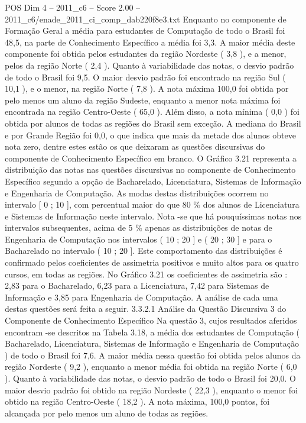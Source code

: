 \begin{textsample}{POS Dim 4 – 2011\_c6 – Score 2.00 – 2011\_c6/enade\_2011\_ci\_comp\_dab220f8e3.txt}
Enquanto no componente de Formação Geral a média para estudantes de Computação de todo o Brasil foi 48,5, na parte de Conhecimento Específico a média foi 3,3.
A maior média deste componente foi obtida pelos estudantes da região Nordeste ( 3,8 ), e a menor, pelos da região Norte ( 2,4 ).
Quanto à variabilidade das notas, o desvio padrão de todo o Brasil foi 9,5.
O maior desvio padrão foi encontrado na região Sul ( 10,1 ), e o menor, na região Norte ( 7,8 ).
A nota máxima 100,0 foi obtida por pelo menos um aluno da região Sudeste, enquanto a menor nota máxima foi encontrada na região Centro-Oeste ( 65,0 ).
Além disso, a nota mínima ( 0,0 ) foi obtida por alunos de todas as regiões do Brasil sem exceção.
A mediana do Brasil e por Grande Região foi 0,0, o que indica que mais da metade dos alunos obteve nota zero, dentre estes estão os que deixaram as questões discursivas do componente de Conhecimento Específico em branco.
O Gráfico 3.21 representa a distribuição das notas nas questões discursivas no componente de Conhecimento Específico segundo a opção de Bacharelado, Licenciatura, Sistemas de Informação e Engenharia de Computação.
As modas destas distribuições ocorrem no intervalo [ 0 ; 10 ], com percentual maior do que 80 \% dos alunos de Licenciatura e Sistemas de Informação neste intervalo.
Nota -se que há pouquíssimas notas nos intervalos subsequentes, acima de 5 \% apenas as distribuições de notas de Engenharia de Computação nos intervalos ( 10 ; 20 ] e ( 20 ; 30 ] e para o Bacharelado no intervalo ( 10 ; 20 ].
Este comportamento das distribuições é confirmado pelos coeficientes de assimetria positivos e muito altos para os quatro cursos, em todas as regiões.
No Gráfico 3.21 os coeficientes de assimetria são : 2,83 para o Bacharelado, 6,23 para a Licenciatura, 7,42 para Sistemas de Informação e 3,85 para Engenharia de Computação.
A análise de cada uma destas questões será feita a seguir. 3.3.2.1 Análise da Questão Discursiva 3 do Componente de Conhecimento Específico Na questão 3, cujos resultados aferidos encontram -se descritos na Tabela 3.18, a média dos estudantes de Computação ( Bacharelado, Licenciatura, Sistemas de Informação e Engenharia de Computação ) de todo o Brasil foi 7,6.
A maior média nessa questão foi obtida pelos alunos da região Nordeste ( 9,2 ), enquanto a menor média foi obtida na região Norte ( 6,0 ).
Quanto à variabilidade das notas, o desvio padrão de todo o Brasil foi 20,0.
O maior desvio padrão foi obtido na região Nordeste ( 22,3 ), enquanto o menor foi obtido na região Centro-Oeste ( 18,2 ).
A nota máxima, 100,0 pontos, foi alcançada por pelo menos um aluno de todas as regiões.

\end{textsample}
